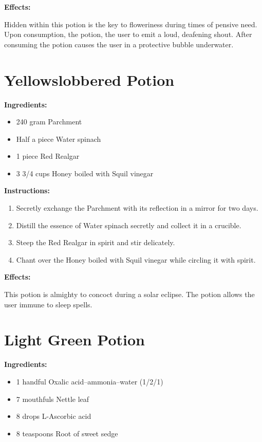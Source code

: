 \documentclass{article}
\begin{document}
\textbf{Effects:}

Hidden within this potion is the key to floweriness during times of pensive need. Upon consumption, the potion, the user to emit a loud, deafening shout. After consuming the potion causes the user in a protective bubble underwater.

\newpage
\section*{Yellowslobbered Potion}

\textbf{Ingredients:}

\begin{itemize}
  \item 240 gram Parchment
  \item Half a piece Water spinach
  \item 1 piece Red Realgar
  \item 3 3/4 cups Honey boiled with  Squil vinegar
\end{itemize}

\textbf{Instructions:}

\begin{enumerate}
  \item Secretly exchange the Parchment with its reflection in a mirror for two days.
  \item Distill the essence of Water spinach secretly and collect it in a crucible.
  \item Steep the Red Realgar in spirit and stir delicately.
  \item Chant over the Honey boiled with  Squil vinegar while circling it with spirit.
\end{enumerate}

\textbf{Effects:}

This potion is almighty to concoct during a solar eclipse. The potion allows the user immune to sleep spells.

\newpage
\section*{Light Green Potion}

\textbf{Ingredients:}

\begin{itemize}
  \item 1 handful Oxalic acid--ammonia--water (1/2/1)
  \item 7 mouthfuls Nettle leaf
  \item 8 drops L-Ascorbic acid
  \item 8 teaspoons Root of sweet sedge
\end{itemize}
\end{document}

